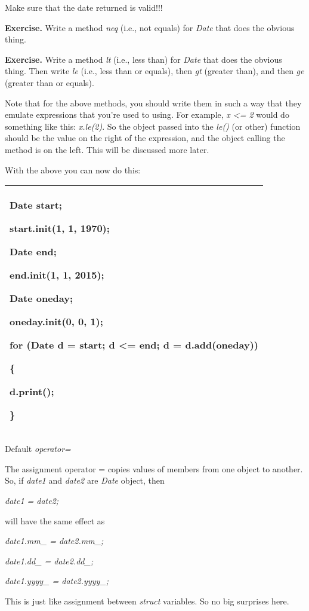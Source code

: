\documentclass[
]{article}
\begin{document}
Make sure that the date returned is valid!!!

\textbf{Exercise.} Write a method \emph{neq} (i.e., not equals) for
\emph{Date} that does the obvious thing.

\textbf{Exercise.} Write a method \emph{lt} (i.e., less than) for
\emph{Date} that does the obvious thing. Then write \emph{le} (i.e.,
less than or equals), then \emph{gt} (greater than), and then \emph{ge}
(greater than or equals).

Note that for the above methods, you should write them in such a way
that they emulate expressions that you're used to using. For example,
\emph{x \textless= 2} would do something like this: \emph{x.le(2)}. So
the object passed into the \emph{le()} (or other) function should be the
value on the right of the expression, and the object calling the method
is on the left. This will be discussed more later.

With the above you can now do this:

\begin{longtable}[]{@{}l@{}}
\toprule
\endhead
\begin{minipage}[t]{0.97\columnwidth}\raggedright
Date start;

start.init(1, 1, 1970);

Date end;

end.init(1, 1, 2015);

Date oneday;

oneday.init(0, 0, 1);

for (Date d = start; d \textless= end; d = d.add(oneday))

\{

d.print();

\}\strut
\end{minipage}\tabularnewline
\bottomrule
\end{longtable}

Default \emph{operator=}

The assignment operator = copies values of members from one object to
another. So, if \emph{date1} and \emph{date2} are \emph{Date} object,
then

\emph{date1 = date2;}

will have the same effect as

\emph{date1.mm\_ = date2.mm\_;}

\emph{date1.dd\_ = date2.dd\_;}

\emph{date1.yyyy\_ = date2.yyyy\_;}

This is just like assignment between \emph{struct} variables. So no big
surprises here.
\end{document}
